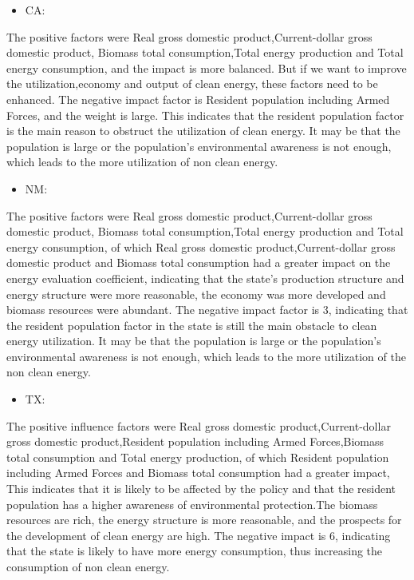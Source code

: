 \documentclass[a4paper]{article}
\begin{document}
\begin{itemize}
\item CA:
\end{itemize}

The positive factors were Real gross domestic product,Current-dollar gross domestic product, Biomass total consumption,Total energy production and Total energy consumption, and the impact is more balanced. But if we want to improve the utilization,economy and output of clean energy, these factors need to be enhanced. The negative impact factor is Resident population including Armed Forces, and the weight is large. This indicates that the resident population factor is the main reason to obstruct the utilization of clean energy. It may be that the population is large or the population's environmental awareness is not enough, which leads to the more utilization of non clean energy.

\begin{itemize}
\item NM:
\end{itemize}

The positive factors were Real gross domestic product,Current-dollar gross domestic product, Biomass total consumption,Total energy production and Total energy consumption, of which Real gross domestic product,Current-dollar gross domestic product and Biomass total consumption had a greater impact on the energy evaluation coefficient, indicating that the state's production structure and energy structure were more reasonable, the economy was more developed and biomass resources were abundant. The negative impact factor is 3, indicating that the resident population factor in the state is still the main obstacle to clean energy utilization. It may be that the population is large or the population's environmental awareness is not enough, which leads to the more utilization of the non clean energy.

\begin{itemize}
\item TX:
\end{itemize}

The positive influence factors were Real gross domestic product,Current-dollar gross domestic product,Resident population including Armed Forces,Biomass total consumption and Total energy production, of which Resident population including Armed Forces and Biomass total consumption had a greater impact, This indicates that it is likely to be affected by the policy and that the resident population has a higher awareness of environmental protection.The biomass resources are rich, the energy structure is more reasonable, and the prospects for the development of clean energy are high. The negative impact is 6, indicating that the state is likely to have more energy consumption, thus increasing the consumption of non clean energy.
\end{document}
